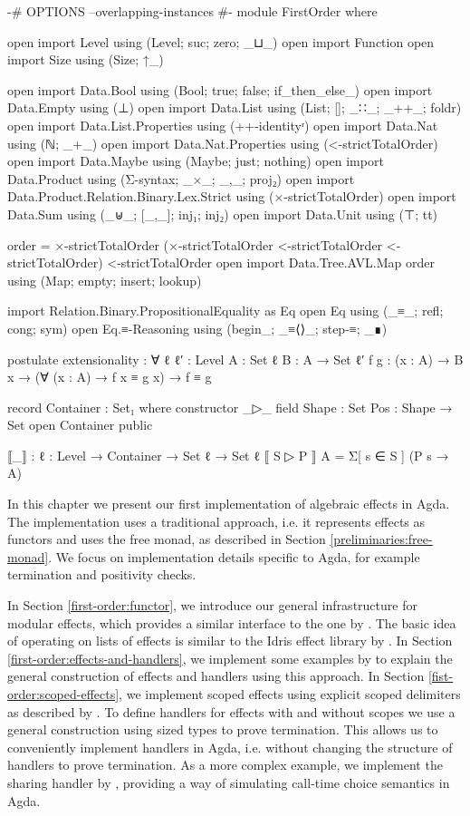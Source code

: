 \begin{code}[hide]
{-# OPTIONS --overlapping-instances #-}
module FirstOrder where

open import Level using (Level; suc; zero; _⊔_)
open import Function
open import Size using (Size; ↑_)

open import Data.Bool using (Bool; true; false; if_then_else_)
open import Data.Empty using (⊥)
open import Data.List using (List; []; _∷_; _++_; foldr)
open import Data.List.Properties using (++-identityʳ)
open import Data.Nat using (ℕ; _+_)
open import Data.Nat.Properties using (<-strictTotalOrder)
open import Data.Maybe using (Maybe; just; nothing)
open import Data.Product using (Σ-syntax; _×_; _,_; proj₂)
open import Data.Product.Relation.Binary.Lex.Strict using (×-strictTotalOrder)
open import Data.Sum using (_⊎_; [_,_]; inj₁; inj₂)
open import Data.Unit using (⊤; tt)

order = ×-strictTotalOrder (×-strictTotalOrder <-strictTotalOrder <-strictTotalOrder) <-strictTotalOrder
open import Data.Tree.AVL.Map order using (Map; empty; insert; lookup)

import Relation.Binary.PropositionalEquality as Eq
open Eq using (_≡_; refl; cong; sym)
open Eq.≡-Reasoning using (begin_; _≡⟨⟩_; step-≡; _∎)

postulate
  extensionality : ∀ {ℓ ℓ′ : Level} {A : Set ℓ} {B : A → Set ℓ′} {f g : (x : A) → B x}
      → (∀ (x : A) → f x ≡ g x) → f ≡ g

record Container : Set₁ where
  constructor _▷_
  field
    Shape : Set
    Pos : Shape → Set
open Container public

⟦_⟧ : {ℓ : Level} → Container → Set ℓ → Set ℓ
⟦ S ▷ P ⟧ A = Σ[ s ∈ S ] (P s → A)
\end{code}

In this chapter we present our first implementation of algebraic effects in Agda.
The implementation uses a traditional approach, i.e. it represents effects as
functors and uses the free monad, as described in Section
\ref{preliminaries:free-monad}.
We focus on implementation details specific to Agda, for example termination and
positivity checks.

In Section \ref{first-order:functor}, we introduce our general infrastructure for
modular effects, which provides a similar interface to the one by
\textcite{DBLP:conf/haskell/WuSH14}.
The basic idea of operating on lists of effects is similar to the Idris effect
library by \textcite{DBLP:conf/icfp/Brady13}.
In Section \ref{first-order:effects-and-handlers}, we implement some
examples by \textcite{DBLP:conf/haskell/WuSH14} to explain the general
construction of effects and handlers using this approach.
In Section \ref{fist-order:scoped-effects}, we implement scoped effects using
explicit scoped delimiters as described by \textcite{DBLP:conf/haskell/WuSH14}.
To define handlers for effects with and without scopes we use a general
construction using sized types to prove termination.
This allows us to conveniently implement handlers in Agda, i.e. without changing
the structure of handlers to prove termination.
As a more complex example, we implement the sharing handler by
\textcite{bunkenburg2019modeling}, providing a way of simulating call-time
choice semantics in Agda.


